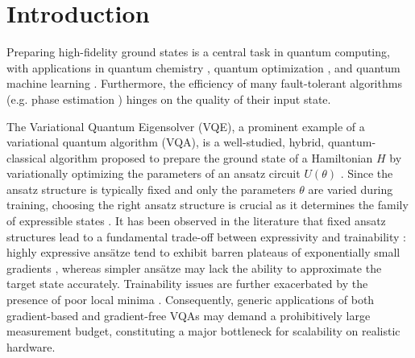 \section{Introduction}
Preparing high-fidelity ground states is a central task in quantum computing, with applications in quantum chemistry \cite{kandala2017hardware}, quantum optimization \cite{farhi2014quantum, moll2018quantum}, and quantum machine learning \cite{farhi2018classification, cong2019quantum, peruzzo2014variational, cerezo2021variational, koczor2022quantum, koczor2022quantum2}. Furthermore, the efficiency of many fault-tolerant algorithms (e.g. phase estimation \cite{wang2022state}) hinges on the quality of their input state.

The Variational Quantum Eigensolver (VQE), a prominent example of a variational quantum algorithm (VQA), is a well-studied, hybrid, quantum-classical algorithm proposed to prepare the ground state of a Hamiltonian $H$ by variationally optimizing the parameters of an ansatz circuit $U(\theta)$ \cite{cerezo2021variational, peruzzo2014variational}. Since the ansatz structure is typically fixed and only the parameters $\theta$ are varied during training, choosing the right ansatz structure is crucial as it determines the family of expressible states \cite{kandala2017hardware, romero2018strategies, wecker2015progress}. It has been observed in the literature that fixed ansatz structures lead to a fundamental trade-off between expressivity and trainability \cite{holmes2022connecting}: highly expressive ansätze tend to exhibit barren plateaus of exponentially small gradients \cite{mcclean2018barren, larocca2024review, cerezo2021cost, wang2021noise}, whereas simpler ansätze may lack the ability to approximate the target state accurately. Trainability issues are further exacerbated by the presence of poor local minima \cite{anschuetz2022quantum, bittel2021training}. %
Consequently, generic applications of both gradient-based and gradient-free VQAs may demand a prohibitively large measurement budget, constituting a major bottleneck for scalability on realistic hardware. 

